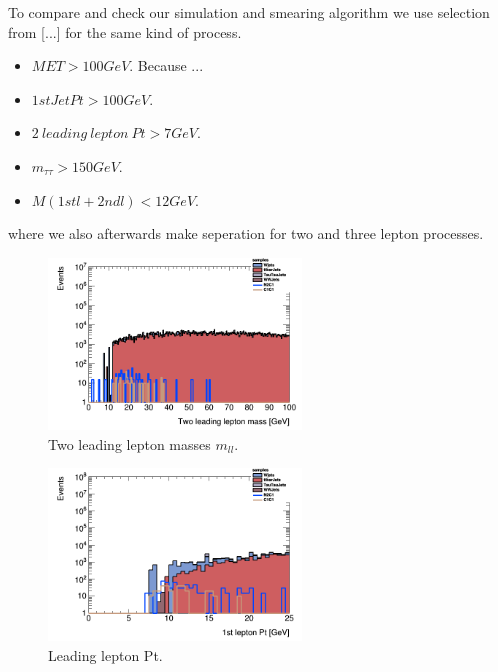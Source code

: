 \documentclass[tightenline,notitlepage,nofootinbib]{revtex4-1}
\begin{document}
To compare and check our simulation and smearing algorithm we use selection from [...] for the same kind of process.  
\begin{itemize}
\item $MET>100 GeV$. Because ...
\item $1stJet Pt>100GeV$. 
\item $2~ leading ~ lepton ~ Pt > 7 GeV$.
\item $m_{\tau \tau}>150 GeV$.
\item $M(1st l + 2nd l)<12 GeV$.
\end{itemize}
where we also afterwards make seperation for two and three lepton processes. 

\begin{figure}
  \includegraphics[width=0.6\textwidth]{h_llmass_cuts.png}
  \caption{Two leading lepton masses $m_{ll}$.}
\end{figure}

\begin{figure}
  \includegraphics[width=0.6\textwidth]{h_PtMuons1st_cuts.png}
  \caption{Leading lepton Pt.}
\end{figure}

     
  
\end{document}
